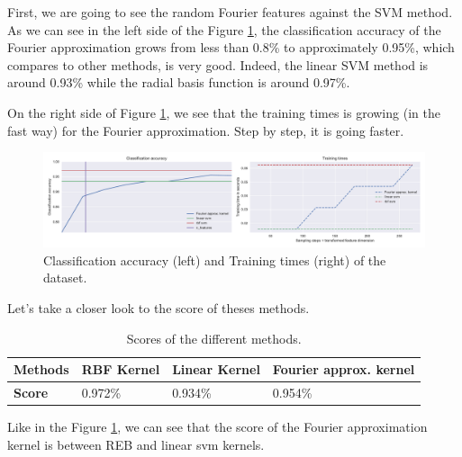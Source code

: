 \documentclass{article}
\begin{document}
First, we are going to see the random Fourier features against the SVM method. 
As we can see in the left side of the Figure \ref{accuracy_time}, the classification accuracy of the Fourier approximation grows from less than 0.8\% to approximately 0.95\%, which compares to other methods, is very good. Indeed, the linear SVM method is around 0.93\% while the radial basis function is around 0.97\%. 

\newpage
On the right side of Figure \ref{accuracy_time}, we see that the training times is growing (in the fast way) for the Fourier approximation. Step by step, it is going faster.  \\
\begin{figure}[h!]
    \centering
    \includegraphics[scale=0.45]{images/accuracy_and_timescale.pdf}
    \caption{Classification accuracy (left) and Training times (right) of the dataset.}
    \label{accuracy_time}
\end{figure}

Let's take a closer look to the score of theses methods. 
\begin{table}[h!]
   \centering
    \begin{tabular}{|p{2cm}||p{3cm}|p{3cm}|p{3cm}|}
    \hline
    \textbf{Methods} & RBF Kernel & Linear Kernel & Fourier approx. kernel \\
    \hline
     \textbf{Score} & 0.972\% & 0.934\% & 0.954\%\\ 
     \hline
    \end{tabular}
    \caption{Scores of the different methods.}
    \label{Table score}
\end{table}

Like in the Figure \ref{accuracy_time}, we can see that the score of the Fourier approximation kernel is between REB and linear svm kernels. \\
\end{document}
